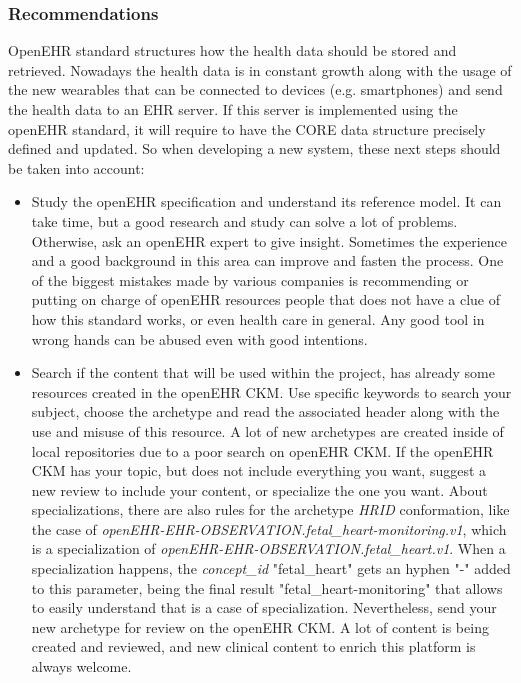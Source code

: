 \documentclass[mim_thesis.tex]{subfiles}
\begin{document}
\subsubsection{Recommendations}
OpenEHR standard structures how the health data should be stored and retrieved. Nowadays the health data is in constant growth along with the usage of the new wearables that can be connected to devices (e.g. smartphones) and send the health data to an EHR server. If this server is implemented using the openEHR standard, it will require to have the CORE data structure precisely defined and updated. So when developing a new system, these next steps should be taken into account:
% 
% 

\begin{itemize}
\item Study the openEHR specification and understand its reference model. It can take time, but a good research and study can solve a lot of problems. Otherwise, ask an openEHR expert to give insight. Sometimes the experience and a good background in this area can improve and fasten the process. One of the biggest mistakes made by various companies is recommending or putting on charge of openEHR resources people that does not have a clue of how this standard works, or even health care in general. Any good tool in wrong hands can be abused even with good intentions.

\item Search if the content that will be used within the project, has already some resources created in the openEHR CKM. Use specific keywords to search your subject, choose the archetype and read the associated header along with the use and misuse of this resource. A lot of new archetypes are created inside of local repositories due to a poor search on openEHR CKM. If the openEHR CKM has your topic, but does not include everything you want, suggest a new review to include your content, or specialize the one you want. About specializations, there are also rules for the archetype \textit{HRID} conformation, like the case of \textit{openEHR-EHR-OBSERVATION.fetal\_heart-monitoring.v1}, which is a specialization of \textit{openEHR-EHR-OBSERVATION.fetal\_heart.v1}. When a specialization happens, the \textit{concept\_id} "fetal\_heart" gets an hyphen "-" added to this parameter, being the final result "fetal\_heart-monitoring" that allows to easily understand that is a case of specialization. Nevertheless, send your new archetype for review on the openEHR CKM. A lot of content is being created and reviewed, and new clinical content to enrich this platform is always welcome. 


\end{itemize}
\end{document}
